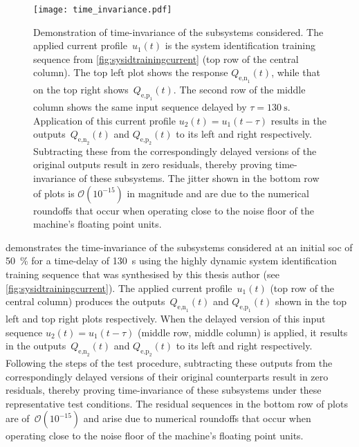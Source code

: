 \begin{figure}[!htb]
    \centering
    \texttt{[image: time\_invariance.pdf]}
    \caption[Demonstration of time-invariance of~$Q_\text{e,n}(t)$ and
    $Q_\text{e,p}(t)$ subsystems]{Demonstration of time-invariance of the
        subsystems considered. The applied current profile~$u_1(t)$ is the
        system identification training sequence
        from \cref{fig:sysidtrainingcurrent} (top row of the central column).
        The top left plot shows the response $Q_{\text{e,n}_1}\!(t)$, while that
        on the top right shows~$Q_{\text{e,p}_1}\!(t)$. The second row of the
        middle column shows the same input sequence delayed by ${\tau =
        \SI{130}{\second}}$. Application of this current profile $u_2(t) =
        u_1(t-\tau)$ results in the outputs~$Q_{\text{e,n}_2}\!(t)$ and
        $Q_{\text{e,p}_2}\!(t)$ to its left and right respectively. Subtracting
        these from the correspondingly delayed versions of the original outputs
        result in zero residuals, thereby proving time-invariance of these
        subsystems. The jitter shown in the bottom row of plots is
        $\mathcal{O}(10^{-15})$ in magnitude and are due to the numerical
        roundoffs that occur when operating close to the noise floor of the
    machine's floating point units.}%
\label{fig:timeinvariance}
\end{figure}

  demonstrates the  time-invariance  of the  subsystems
considered  at  an  initial  \gls{soc} of  \SI{50}{\percent}  for  a  time-delay
of   \SI{130}{\second}   using   the  highly   dynamic   system   identification
training    sequence   that    was   synthesised    by   this    thesis   author
(see \cref{fig:sysidtrainingcurrent}).  The  applied  current  profile~$u_1(t)$
(top row  of the  central column)  produces the  outputs~$Q_{\text{e,n}_1}\!(t)$
and  $Q_{\text{e,p}_1}\!(t)$  shown  in  the   top  left  and  top  right  plots
respectively.  When  the delayed  version  of  this  input sequence  ${u_2(t)  =
u_1(t-\tau)}$ (middle row, middle column) is  applied, it results in the
outputs~$Q_{\text{e,n}_2}\!(t)$  and  $Q_{\text{e,p}_2}\!(t)$  to  its  left 
and  right respectively.  Following the  steps  of the  test  procedure,
subtracting  these outputs from the correspondingly delayed versions of their
original counterparts result in  zero residuals, thereby  proving
time-invariance of  these subsystems under these representative test conditions.
The residual sequences in the bottom row of plots are of~$\mathcal{O}(10^{-15})$
and arise due to numerical roundoffs that occur  when operating close  to the
noise  floor of the  machine's floating point units.

